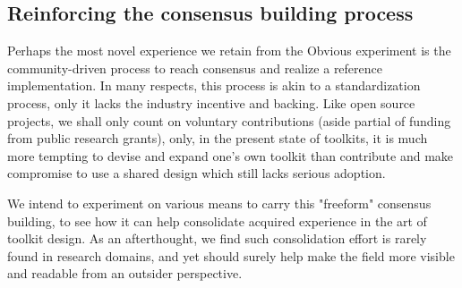 \subsection{Reinforcing the consensus building process}

Perhaps the most novel experience we retain from the Obvious experiment is the community-driven process to reach consensus and realize a reference implementation. 
In many respects, this process is akin to a standardization process, only it lacks the industry incentive and backing. Like open source projects, we shall only count on voluntary contributions (aside partial of funding from public research grants), only, in the present state of toolkits, it is much more tempting to devise and expand one's own toolkit than contribute and make compromise to use a shared design which still lacks serious adoption.

We intend to experiment on various means to carry this "freeform" consensus building, to see how it can help consolidate acquired experience in the art of toolkit design. As an afterthought, we find such consolidation effort is rarely found in research domains, and yet should surely help make the field more visible and readable from an outsider perspective.
